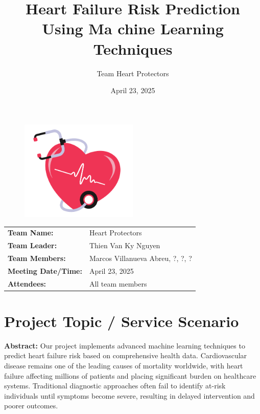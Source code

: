 \documentclass[11pt,a4paper]{article}
\makeatletter
\renewcommand{\maketitle}{
  \begin{center}
    \vspace*{-0.25in} %
    {\LARGE \textbf{\@title}} \\[0.3cm]
    {\large \@subtitle} \\[0.2cm]
    {\normalsize \textit{\@author}} \\[0.1cm]
    {\normalsize \@date} \\
  \end{center}
  \vspace{0.3cm} %
}
\newcommand{\subtitle}[1]{\def\@subtitle{#1}}
\def\@subtitle{}
\makeatother
\begin{document}
\begin{figure}[H]
    \centering
    \includegraphics[width=0.5\textwidth]{./pictures/cover.png}
\end{figure}




\title{Heart Failure Risk Prediction Using Ma chine Learning Techniques}
\subtitle{Team Meeting Report – Final Report}
\author{Team Heart Protectors}
\date{April 23, 2025}


\begin{tabular}{ll}
    \textbf{Team Name:}         & Heart Protectors    \\
    \textbf{Team Leader:}       & Thien Van Ky Nguyen \\
    \textbf{Team Members:}      & Marcos Villanueva Abreu, ?, ?, ?          \\
    \textbf{Meeting Date/Time:} & April 23, 2025      \\
    \textbf{Attendees:}         & All team members
\end{tabular}

\section{Project Topic / Service Scenario}

\textbf{Abstract:} Our project implements advanced machine learning techniques to predict heart failure
risk based on comprehensive health data.
Cardiovascular disease remains one of the leading causes of mortality worldwide,
with heart failure affecting millions of patients and placing significant
burden on healthcare systems.
Traditional diagnostic approaches often fail to identify
at-risk individuals until symptoms become severe,
resulting in delayed intervention and poorer outcomes.
\end{document}
